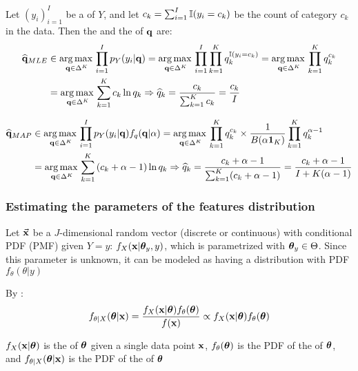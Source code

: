 Let $(y_i)_{i=1}^I$ be a  of $Y$, and let $c_k=\sum_{i=1}^I\operatorname{\mathbb{I}}(y_i=c_k)$ be the count of category $c_k$ in the data. Then the  and the  of $\vb{q}$ are:
\begin{align*}
    \widehat{\vb{q}}_{MLE} &\in\operatorname*{arg\,max\,}\limits_{\vb{q}\in\Delta^K}\prod_{i=1}^I p_Y(y_i|\vb{q})
    =\operatorname*{arg\,max\,}\limits_{\vb{q}\in\Delta^K}\prod_{i=1}^I \prod_{k=1}^Kq_{k}^{\operatorname{\mathbb{I}}(y_i=c_k)}
    =\operatorname*{arg\,max\,}\limits_{\vb{q}\in\Delta^K} \prod_{k=1}^Kq_{k}^{c_k} \\
    &=\operatorname*{arg\,max\,}\limits_{\vb{q}\in\Delta^K}\sum_{k=1}^Kc_k\ln q_{k} \Rightarrow \widehat{q}_k=\frac{c_k}{\sum_{k=1}^Kc_k}=\frac{c_k}{I}
\end{align*}

\begin{align*}
    \widehat{\vb{q}}_{MAP} &\in\operatorname*{arg\,max\,}\limits_{\vb{q}\in\Delta^K}\prod_{i=1}^I p_Y(y_i|\vb{q})f_q(\vb{q}|\alpha)
    =\operatorname*{arg\,max\,}\limits_{\vb{q}\in\Delta^K} \prod_{k=1}^Kq_{k}^{c_k}\times \frac{1}{B(\alpha\vb{1}_K)}\prod_{k=1}^Kq_{k}^{\alpha-1} \\
    &=\operatorname*{arg\,max\,}\limits_{\vb{q}\in\Delta^K}\sum_{k=1}^K\left(c_k+\alpha-1\right)\ln q_{k} \Rightarrow \widehat{q}_k=\frac{c_k+\alpha-1}{\sum_{k=1}^K(c_k+\alpha-1)}=\frac{c_k+\alpha-1}{I+K(\alpha-1)}
\end{align*}




\subsubsection{Estimating the parameters of the features distribution}

Let $\va{x}$ be a $J$-dimensional random vector (discrete or continuous) with conditional PDF (PMF) given $Y=y$: $f_X(\vb{x}|\vb*{\theta}_y,y)$, which is parametrized with $\vb*{\theta}_y\in\Theta$. Since this parameter is unknown, it can be modeled as having a distribution with PDF $f_\theta(\theta|y)$\medskip

By :
\begin{equation*}
    f_{\theta|X}(\vb*{\theta}|\vb{x})=\frac{f_{X}(\vb{x}|\vb*{\theta})f_\theta(\vb*{\theta})}{f(\vb{x})}\propto f_{X}(\vb{x}|\vb*{\theta})f_\theta(\vb*{\theta})
\end{equation*}

$f_{X}(\vb{x}|\vb*{\theta})$ is the  of $\vb*{\theta}$ given a single data point $\vb{x}$, $f_\theta(\vb*{\theta})$ is the PDF of the  of $\vb*{\theta}$, and  $f_{\theta|X}(\vb*{\theta}|\vb{x})$ is the PDF of the  of $\vb*{\theta}$\medskip

